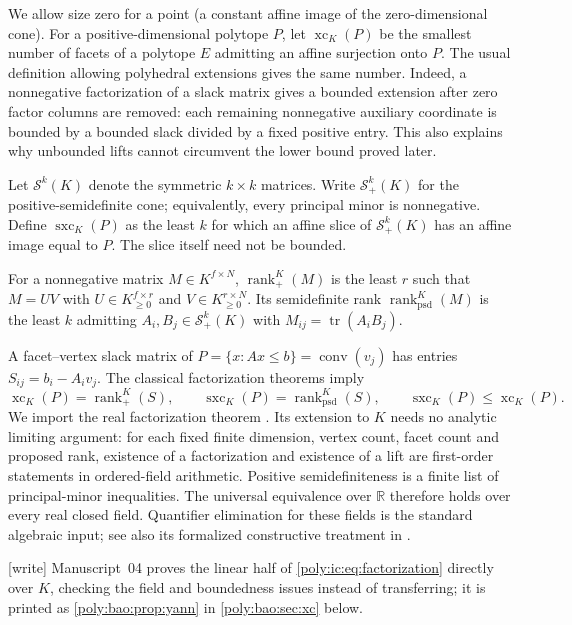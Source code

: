 \documentclass[11pt,a4paper]{article}
\numberwithin{equation}{section}
\theoremstyle{plain}
\newcommand{\wtag}{\textup{[write]}}%
\newcommand{\R}{\mathbb R}
\newcommand{\conv}{\operatorname{conv}}
\newcommand{\xc}{\operatorname{xc}}
\newcommand{\sx}{\operatorname{sxc}}
\newcommand{\rankp}{\operatorname{rank}_{+}}
\newcommand{\rankpsd}{\operatorname{rank}_{\mathrm{psd}}}
\newcommand{\tr}{\operatorname{tr}}%
\newcommand{\Sym}{\mathcal S}
\begin{document}
We allow size zero for a point (a constant affine image of the zero-dimensional cone).
For a positive-dimensional polytope $P$, let $\xc_K(P)$ be the smallest
number of facets of a polytope $E$ admitting an affine surjection onto $P$.
The usual definition allowing polyhedral extensions gives the same number.
Indeed, a nonnegative factorization of a slack matrix gives a bounded
extension after zero factor columns are removed: each remaining
nonnegative auxiliary coordinate is bounded by a bounded slack divided by
a fixed positive entry. This also explains why unbounded lifts cannot
circumvent the lower bound proved later.

Let $\Sym^k(K)$ denote the symmetric $k\times k$ matrices. Write
$\Sym^k_+(K)$ for the positive-semidefinite cone; equivalently, every
principal minor is nonnegative. Define $\sx_K(P)$ as the least $k$ for
which an affine slice of $\Sym^k_+(K)$ has an affine image equal to $P$.
The slice itself need not be bounded.

\begin{definition}\label{poly:ic:def:ranks}
For a nonnegative matrix $M\in K^{f\times N}$, $\rankp^K(M)$ is the least
$r$ such that $M=UV$ with $U\in K_{\geq0}^{f\times r}$ and
$V\in K_{\geq0}^{r\times N}$. Its semidefinite rank $\rankpsd^K(M)$ is the
least $k$ admitting $A_i,B_j\in\Sym^k_+(K)$ with
$M_{ij}=\tr(A_iB_j)$.
\end{definition}

A facet--vertex slack matrix of $P=\{x:Ax\leq b\}=\conv(v_j)$ has entries
$S_{ij}=b_i-A_i v_j$. The classical factorization theorems imply
\begin{equation}\label{poly:ic:eq:factorization}
 \xc_K(P)=\rankp^K(S),\qquad
 \sx_K(P)=\rankpsd^K(S),\qquad
 \sx_K(P)\leq\xc_K(P).
\end{equation}
We import the real factorization theorem \cite{ic:yannakakis,ic:gpt}. Its
extension to $K$ needs no analytic limiting argument: for each fixed
finite dimension, vertex count, facet count and proposed rank, existence
of a factorization and existence of a lift are first-order statements in
ordered-field arithmetic. Positive semidefiniteness is a finite list of
principal-minor inequalities. The universal equivalence over $\R$
therefore holds over every real closed field. Quantifier elimination for
these fields is the standard algebraic input; see also its formalized
constructive treatment in \cite{ic:cohenmahboubi}.

\wtag{} Manuscript~04 proves the linear half of
\eqref{poly:ic:eq:factorization} directly over $K$, checking the field and
boundedness issues instead of transferring; it is printed as
\cref{poly:bao:prop:yann} in \cref{poly:bao:sec:xc} below.
\end{document}
